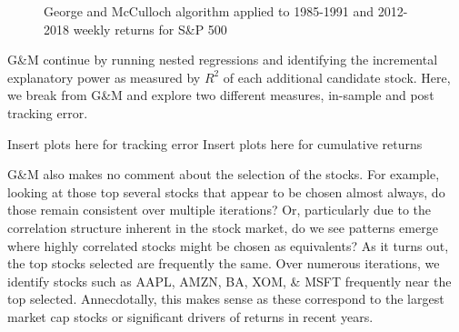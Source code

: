 \documentclass[a4paper, 12pt]{article}
\theoremstyle{plain}
\theoremstyle{definition}
\theoremstyle{remark}
\begin{document}
\begin{figure}[H]
\centering
\hfill
{}
\hfill
{}
\hfill
\caption{George and McCulloch algorithm applied to 1985-1991 and 2012-2018 weekly returns for S\&P 500}
\end{figure}



G\&M continue by running nested regressions and identifying the incremental explanatory power as measured by $R^2$ of each additional candidate stock. Here, we break from G\&M and explore two different measures, in-sample and post tracking error.

{\color{red} Insert plots here for tracking error}
{\color{red} Insert plots here for cumulative returns}

G\&M also makes no comment about the selection of the stocks. For example, looking at those top several stocks that appear to be chosen almost always, do those remain consistent over multiple iterations? Or, particularly due to the correlation structure inherent in the stock market, do we see patterns emerge where highly correlated stocks might be chosen as equivalents? As it turns out, the top stocks selected are frequently the same. Over numerous iterations, we identify stocks such as AAPL, AMZN, BA, XOM, \& MSFT frequently near the top selected. Annecdotally, this makes sense as these correspond to the largest market cap stocks or significant drivers of returns in recent years.
\end{document}
